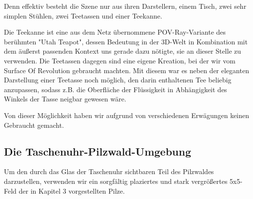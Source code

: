 \documentclass[twocolumn]{article}
\begin{document}
Denn effektiv besteht die Szene nur aus ihren Darstellern, einem Tisch, zwei sehr simplen Stühlen, zwei Teetassen und einer Teekanne.

Die Teekanne ist eine aus dem Netz übernommene POV-Ray-Variante des berühmten "Utah Teapot", dessen Bedeutung in der 3D-Welt in Kombination mit dem äußerst passenden Kontext uns gerade dazu nötigte, sie an dieser Stelle zu verwenden.
Die Teetassen dagegen sind eine eigene Kreation, bei der wir vom Surface Of Revolution gebraucht machten. Mit diesem war es neben der eleganten Darstellung einer Teetasse noch möglich, den darin enthaltenen Tee beliebig anzupassen, sodass z.B. die Oberfläche der Flüssigkeit in Abhängigkeit des Winkels der Tasse neigbar gewesen wäre.

Von dieser Möglichkeit haben wir aufgrund von verschiedenen Erwägungen keinen Gebraucht gemacht.


\subsection{Die Taschenuhr-Pilzwald-Umgebung}
Um den durch das Glas der Taschenuhr sichtbaren Teil des Pilzwaldes darzustellen, verwenden wir ein sorgfältig plaziertes und stark vergrößertes 5x5-Feld der in Kapitel 3 vorgestellten Pilze.
\end{document}
